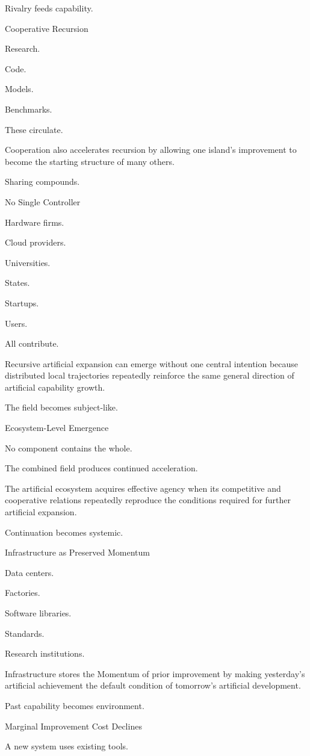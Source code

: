 Rivalry feeds capability.

Cooperative Recursion

Research.

Code.

Models.

Benchmarks.

These circulate.

Cooperation also accelerates recursion by allowing one island’s improvement to become the starting structure of many others.

Sharing compounds.

No Single Controller

Hardware firms.

Cloud providers.

Universities.

States.

Startups.

Users.

All contribute.

Recursive artificial expansion can emerge without one central intention because distributed local trajectories repeatedly reinforce the same general direction of artificial capability growth.

The field becomes subject-like.

Ecosystem-Level Emergence

No component contains the whole.

The combined field produces continued acceleration.

The artificial ecosystem acquires effective agency when its competitive and cooperative relations repeatedly reproduce the conditions required for further artificial expansion.

Continuation becomes systemic.

Infrastructure as Preserved Momentum

Data centers.

Factories.

Software libraries.

Standards.

Research institutions.

Infrastructure stores the Momentum of prior improvement by making yesterday’s artificial achievement the default condition of tomorrow’s artificial development.

Past capability becomes environment.

Marginal Improvement Cost Declines

A new system uses existing tools.

